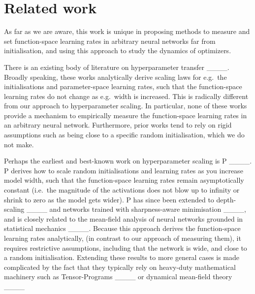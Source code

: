 \section{Related work}
As far as we are aware, this work is unique in proposing methods to measure and set function-space learning rates in arbitrary neural networks far from initialisation, and using this approach to study the dynamics of optimizers.

There is an existing body of literature on hyperparameter transfer ____. Broadly speaking, these works analytically derive scaling laws for e.g.\ the initialisations and parameter-space learning rates, such that the function-space learning rates do not change as e.g.\ width is increased.
This is radically different from our approach to hyperparameter scaling.
In particular, none of these works provide a mechanism to empirically measure the function-space learning rates in an arbitrary neural network.
Furthermore, prior works tend to rely on rigid assumptions such as being close to a specific random initialisation, which we do not make.

Perhaps the earliest and best-known work on hyperparameter scaling is \textmu{}P ____.
\textmu{}P derives how to scale random initialisations and learning rates as you increase model width, such that the function-space learning rates remain asymptotically constant (i.e.\ the magnitude of the activations does not blow up to infinity or shrink to zero as the model gets wider). \textmu{}P has since been extended to depth-scaling ____ and networks trained with sharpness-aware minimisation ____, and is closely related to the mean-field analysis of neural networks grounded in statistical mechanics ____.
Because this approach derives the function-space learning rates analytically, (in contrast to our approach of measuring them), it requires restrictive assumptions, including that the network is wide, and close to a random initialisation. Extending these results to more general cases is made complicated by the fact that they typically rely on heavy-duty mathematical machinery such as Tensor-Programs ____ or dynamical mean-field theory ____

